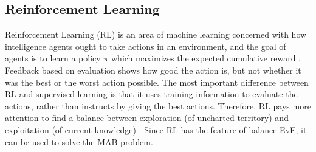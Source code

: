 \documentclass[journal]{IEEEtran}
\begin{document}
\subsection{Reinforcement Learning}
Reinforcement Learning (RL) \cite{sutton2018reinforcement} is an area of machine learning concerned with how intelligence agents ought to take actions in an environment, and the goal of agents is to learn a policy $\pi$ which maximizes the expected cumulative reward \cite{van2012reinforcement}.
Feedback based on evaluation shows how good the action is, but not whether it was the best or the worst action possible.
The most important difference between RL and supervised learning is that it uses training information to evaluate the actions, rather than instructs by giving the best actions.
Therefore, RL pays more attention to find a balance between exploration (of uncharted territory) and exploitation (of current knowledge) \cite{kaelbling1996reinforcement}.
Since RL has the feature of balance EvE, it can be used to solve the MAB problem.
\end{document}

